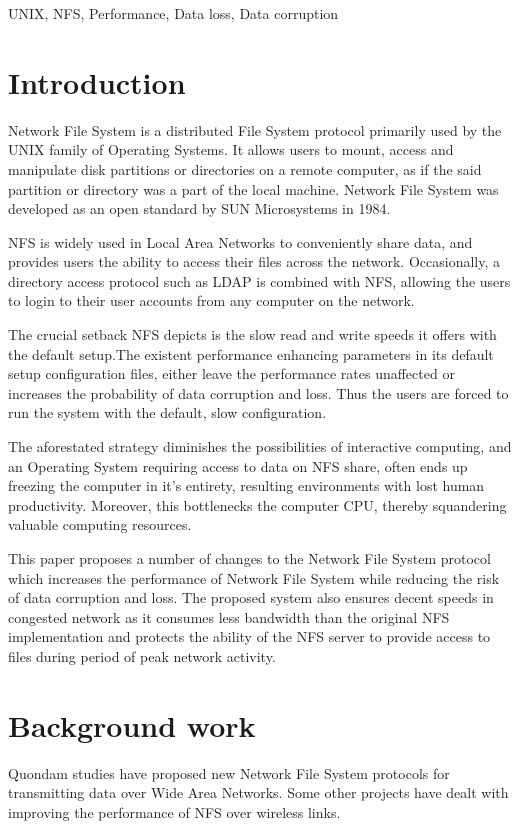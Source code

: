 \documentclass[conference]{IEEEtran}
\begin{document}
\begin{IEEEkeywords}
UNIX,
NFS,
Performance,
Data loss,
Data corruption
\end{IEEEkeywords}

\section{Introduction}
Network File System is a distributed File System protocol primarily used by the  
UNIX family of Operating Systems. It allows users to mount, access and
manipulate disk partitions or directories on a remote computer, as if the
said partition or directory was a part of the local machine. Network File
System was developed as an open standard by SUN Microsystems in 1984.

NFS is widely used in Local Area Networks to conveniently share data, and
provides users the ability to access their files across the network.
Occasionally, a directory access protocol such as LDAP is combined with NFS,
allowing the users to login to their user accounts from any computer on the 
network.

The crucial setback NFS depicts is the slow read and write speeds it offers
with the default setup.The existent performance enhancing parameters in its 
default setup configuration files, either leave the performance rates unaffected
or increases the probability of data corruption and loss. Thus the users are 
forced to run the system with the default, slow configuration.

The aforestated strategy diminishes the possibilities of interactive computing, 
and an Operating System requiring access to data on NFS share, often ends up 
freezing the computer in it's entirety, resulting environments with lost human 
productivity. Moreover, this bottlenecks the computer CPU, thereby squandering
valuable computing resources. 

This paper proposes a number of changes to the Network File System protocol
which increases the performance of Network File System while reducing
the risk of data corruption and loss. The proposed system also ensures
decent speeds in congested network as it consumes less bandwidth than the 
original NFS implementation and protects the ability of the NFS server to
provide access to files during period of peak network activity.

\section{Background work}
Quondam studies have proposed new Network File System protocols for
transmitting data over Wide Area Networks. Some other projects have dealt with
improving the performance of NFS over wireless links.
\end{document}
